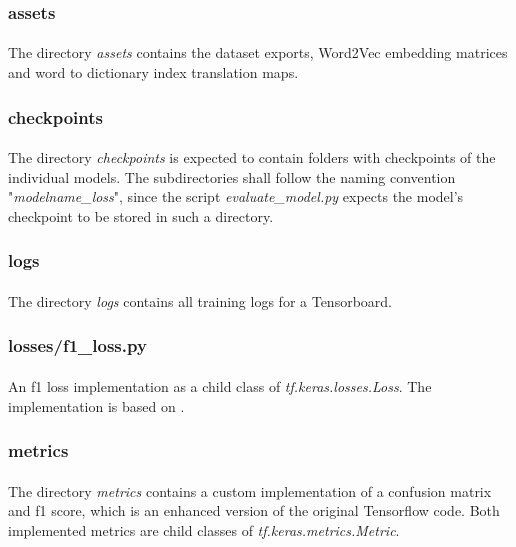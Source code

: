 \subsubsection{assets}
\paragraph{}
The directory \textit{assets} contains the dataset exports, Word2Vec embedding matrices and word to dictionary index translation maps.

\subsubsection{checkpoints}
\paragraph{}
The directory \textit{checkpoints} is expected to contain folders with checkpoints of the individual models. The subdirectories shall follow the naming convention "\textit{modelname\_loss}", since the script \textit{evaluate\_model.py} expects the model's checkpoint to be stored in such a directory.

\subsubsection{logs}
\paragraph{}
The directory \textit{logs} contains all training logs for a Tensorboard.

\subsubsection{losses/f1\_loss.py}
\paragraph{}
An f1 loss implementation as a child class of \textit{tf.keras.losses.Loss}. The implementation is based on \cite{f1_loss}.

\subsubsection{metrics}
\paragraph{}
The directory \textit{metrics} contains a custom implementation of a confusion matrix and f1 score, which is an enhanced version of the original Tensorflow code. Both implemented metrics are child classes of \textit{tf.keras.metrics.Metric}.

